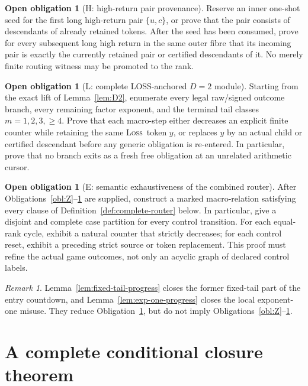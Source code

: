 \documentclass[11pt,a4paper]{article}
\theoremstyle{definition}
\newtheorem{obligation}[theorem]{Open obligation}
\theoremstyle{remark}
\newtheorem{remark}[theorem]{Remark}
\newcommand{\LOSS}{\textnormal{\textsc{Loss}}}
\begin{document}
\begin{obligation}[H: high-return pair provenance]\label{obl:H}
Reserve an inner one-shot seed for the first long high-return pair
$\{u,c\}$, or prove that the pair consists of descendants of already retained
tokens.  After the seed has been consumed, prove for every subsequent long
high return in the same outer fibre that its incoming pair is exactly the
currently retained pair or certified descendants of it.  No merely finite
routing witness may be promoted to the rank.
\end{obligation}

\begin{obligation}[L: complete LOSS-anchored $D=2$ module]\label{obl:L}
Starting from the exact lift of Lemma~\ref{lem:D2}, enumerate every legal
raw/signed outcome branch, every remaining factor exponent, and the terminal
tail classes $m=1,2,3,\ge4$.  Prove that each macro-step either decreases an
explicit finite counter while retaining the same \LOSS\ token $y$, or
replaces $y$ by an actual child or certified descendant before any generic
obligation is re-entered.  In particular, prove that no branch exits as a
fresh free obligation at an unrelated arithmetic cursor.
\end{obligation}

\begin{obligation}[E: semantic exhaustiveness of the combined router]\label{obl:E}
After Obligations~\ref{obl:Z}--\ref{obl:L} are supplied, construct a
marked macro-relation satisfying every clause of
Definition~\ref{def:complete-router} below.  In particular, give a disjoint
and complete case partition for every control transition.  For each
equal-rank cycle, exhibit a natural counter that strictly decreases; for
each control reset, exhibit a preceding strict source or token replacement.
This proof must refine the actual game outcomes, not only an acyclic graph
of declared control labels.
\end{obligation}

\begin{remark}
Lemma~\ref{lem:fixed-tail-progress} closes the former fixed-tail part of the
entry countdown, and Lemma~\ref{lem:exp-one-progress} closes the local
exponent-one misuse.  They reduce Obligation~\ref{obl:E}, but do not imply
Obligations~\ref{obl:Z}--\ref{obl:L}.
\end{remark}

\section{A complete conditional closure theorem}
\end{document}
